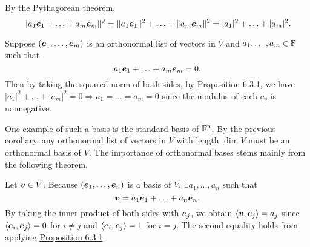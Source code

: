 \documentclass{report}
\DeclareMathOperator{\Fn}{\FF^n}
\begin{document}
	\begin{myproof}
		By the Pythagorean theorem, 
		$$\|a_1\boldsymbol{e}_1+\ldots+a_m\boldsymbol{e}_m\|^2=\|a_1\boldsymbol{e}_1\|^2+\ldots+\|a_m\boldsymbol{e}_m\|^2=|a_1|^2+\ldots+|a_m|^2.$$
	\end{myproof}
	\begin{myproof}
		Suppose $(\boldsymbol{e}_1,\ldots,\boldsymbol{e}_m)$ is an orthonormal list of vectors in $V$ and $a_1,\ldots,a_m\in\FF$ such that 
		$$a_1\boldsymbol{e}_1+\ldots+a_m\boldsymbol{e}_m=0.$$
		Then by taking the squared norm of both sides, by \hyperref[sec:Prop1]{Proposition 6.3.1}, we have $|a_1|^2+\ldots+|a_m|^2=0 \Rightarrow a_1=\ldots=a_m=0$ since the modulus of each $a_j$ is nonnegative. 
	\end{myproof}
	\vspace{1mm}
	\vspace{2mm}
	
	One example of such a basis is the standard basis of $\Fn$. By the previous corollary, any orthonormal list of vectors in $V$ with length $\dim V$ must be an orthonormal basis of $V$. The importance of orthonormal bases stems mainly from the following theorem.
	\begin{myproof}
		Let $\boldsymbol{v}\in V$. Because $(\boldsymbol{e}_1,\ldots,\boldsymbol{e}_n)$ is a basis of $V$, $\exists a_1,\ldots,a_n$ such that
		$$\boldsymbol{v}=a_1\boldsymbol{e}_1+\ldots+a_n\boldsymbol{e}_n.$$
		By taking the inner product of both sides with $\boldsymbol{e}_j$, we obtain $\langle\boldsymbol{v},\boldsymbol{e}_j\rangle=a_j$ since $\langle\boldsymbol{e}_i,\boldsymbol{e}_j\rangle=0$ for $i\neq j$ and $\langle\boldsymbol{e}_i,\boldsymbol{e}_j\rangle=1$ for $i=j$. The second equality holds from applying \hyperref[sec:Prop1]{Proposition 6.3.1}.
	\end{myproof}
	
\end{document}
